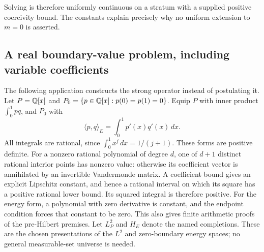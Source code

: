 Solving is therefore uniformly continuous on a stratum with a supplied
positive coercivity bound. The constants explain precisely why no uniform
extension to \(m=0\) is asserted.

\subsection{A real boundary-value problem, including variable coefficients}
\label{subsec:pde}

The following application constructs the strong operator instead of
postulating it. Let \(P=\mathbb Q[x]\) and
\(P_0=\{p\in\mathbb Q[x]:p(0)=p(1)=0\}\).
Equip \(P\) with inner product \(\int_0^1pq\), and \(P_0\) with
\[
                 \langle p,q\rangle_E=\int_0^1p'(x)q'(x)\,dx .
\]
All integrals are rational, since
\(\int_0^1x^j\,dx=1/(j+1)\).
These forms are positive definite. For a nonzero rational polynomial of degree
\(d\), one of \(d+1\) distinct rational interior points has nonzero value:
otherwise its coefficient vector is annihilated by an invertible Vandermonde
matrix. A coefficient bound gives an explicit Lipschitz constant, and hence
a rational interval on which its square has a positive rational lower bound.
Its squared integral is therefore positive. For the energy form, a polynomial
with zero derivative is constant, and the endpoint condition forces that
constant to be zero. This also gives finite arithmetic proofs of the
pre-Hilbert premises.
Let \(L^2_P\) and \(H_E\) denote the named completions.
These are the chosen presentations of the \(L^2\) and zero-boundary energy
spaces; no general measurable-set universe is needed.

